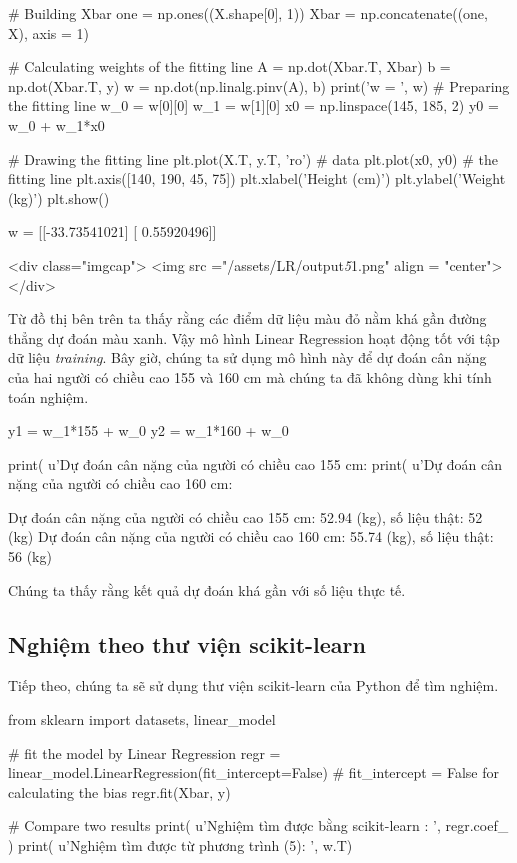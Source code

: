 \begin{listing}
# Building Xbar 
one = np.ones((X.shape[0], 1))
Xbar = np.concatenate((one, X), axis = 1)

# Calculating weights of the fitting line 
A = np.dot(Xbar.T, Xbar)
b = np.dot(Xbar.T, y)
w = np.dot(np.linalg.pinv(A), b)
print('w = ', w)
# Preparing the fitting line 
w_0 = w[0][0]
w_1 = w[1][0]
x0 = np.linspace(145, 185, 2)
y0 = w_0 + w_1*x0

# Drawing the fitting line 
plt.plot(X.T, y.T, 'ro')     # data 
plt.plot(x0, y0)               # the fitting line
plt.axis([140, 190, 45, 75])
plt.xlabel('Height (cm)')
plt.ylabel('Weight (kg)')
plt.show()

\end{listing}

w =  [[-33.73541021]
 [  0.55920496]]



<div class="imgcap">
<img src ="/assets/LR/output\textit{5}1.png" align = "center">
</div>

Từ đồ thị bên trên ta thấy rằng các điểm dữ liệu màu đỏ nằm khá gần đường thẳng dự đoán màu xanh. Vậy mô hình Linear Regression hoạt động tốt với tập dữ liệu \textit{training}. Bây giờ, chúng ta sử dụng mô hình này để dự đoán cân nặng của hai người có chiều cao 155 và 160 cm mà chúng ta đã không dùng khi tính toán nghiệm.


\begin{listing}
y1 = w_1*155 + w_0
y2 = w_1*160 + w_0

print( u'Dự đoán cân nặng của người có chiều cao 155 cm: %
print( u'Dự đoán cân nặng của người có chiều cao 160 cm: %
\end{listing}

    Dự đoán cân nặng của người có chiều cao 155 cm: 52.94 (kg), số liệu thật: 52 (kg)
    Dự đoán cân nặng của người có chiều cao 160 cm: 55.74 (kg), số liệu thật: 56 (kg)



Chúng ta thấy rằng kết quả dự đoán khá gần với số liệu thực tế.


\subsection{Nghiệm theo thư viện scikit-learn}
Tiếp theo, chúng ta sẽ sử dụng thư viện scikit-learn của Python để tìm nghiệm. 


\begin{listing}
from sklearn import datasets, linear_model

# fit the model by Linear Regression
regr = linear_model.LinearRegression(fit_intercept=False) # fit_intercept = False for calculating the bias
regr.fit(Xbar, y)

# Compare two results
print( u'Nghiệm tìm được bằng scikit-learn  : ', regr.coef_ )
print( u'Nghiệm tìm được từ phương trình (5): ', w.T)
\end{listing}

